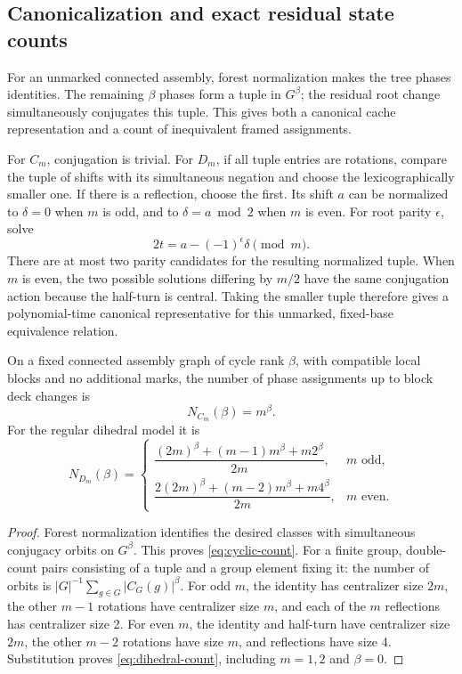 \subsection{Canonicalization and exact residual state counts}

For an unmarked connected assembly, forest normalization makes the tree
phases identities. The remaining $\beta$ phases form a tuple in $G^\beta$;
the residual root change simultaneously conjugates this tuple. This gives
both a canonical cache representation and a count of inequivalent framed
assignments.

For $C_m$, conjugation is trivial. For $D_m$, if all tuple entries are
rotations, compare the tuple of shifts with its simultaneous negation and
choose the lexicographically smaller one. If there is a reflection, choose
the first. Its shift $a$ can be normalized to $\delta=0$ when $m$ is odd,
and to $\delta=a\bmod2$ when $m$ is even. For root parity $\epsilon$,
solve
\[
 2t=a-(-1)^\epsilon\delta\pmod m.
\]
There are at most two parity candidates for the resulting normalized tuple.
When $m$ is even, the two possible solutions differing by $m/2$ have the
same conjugation action because the half-turn is central. Taking the smaller
tuple therefore gives a polynomial-time canonical representative for this
unmarked, fixed-base equivalence relation.

\begin{theorem}
\label{thm:orbits}
On a fixed connected assembly graph of cycle rank $\beta$, with compatible
local blocks and no additional marks, the number of phase assignments up to
block deck changes is
\begin{equation}
 N_{C_m}(\beta)=m^\beta.
 \label{eq:cyclic-count}
\end{equation}
For the regular dihedral model it is
\begin{equation}
 N_{D_m}(\beta)=
 \begin{cases}
 \dfrac{(2m)^\beta+(m-1)m^\beta+m2^\beta}{2m},&m\text{ odd},\\[5pt]
 \dfrac{2(2m)^\beta+(m-2)m^\beta+m4^\beta}{2m},&m\text{ even}.
 \end{cases}
 \label{eq:dihedral-count}
\end{equation}
\end{theorem}
\begin{proof}
Forest normalization identifies the desired classes with simultaneous
conjugacy orbits on $G^\beta$. This proves \eqref{eq:cyclic-count}. For a finite group,
double-count pairs consisting of a tuple and a group element fixing it:
the number of orbits is $|G|^{-1}\sum_{g\in G}|C_G(g)|^\beta$.
For odd $m$, the identity has centralizer size $2m$, the other $m-1$
rotations have centralizer size $m$, and each of the $m$ reflections has
centralizer size 2. For even $m$, the identity and half-turn have centralizer
size $2m$, the other $m-2$ rotations have size $m$, and reflections have
size 4. Substitution proves \eqref{eq:dihedral-count}, including $m=1,2$ and $\beta=0$.
\end{proof}

